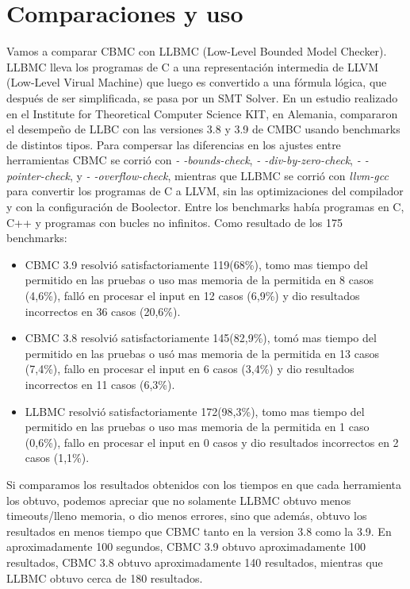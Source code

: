 \documentclass{llncs}
\begin{document}
\section{Comparaciones y uso}
    Vamos a comparar CBMC con LLBMC \cite{firstcomp} (Low-Level Bounded Model
    Checker). LLBMC lleva los programas
    de C a una representación intermedia de LLVM (Low-Level Virual Machine)
    que luego es convertido a una
    fórmula lógica, que después de ser simplificada, se pasa por un SMT Solver.
    En un estudio realizado en el Institute for Theoretical Computer Science
    KIT, en Alemania, compararon el desempeño de LLBC con las versiones 3.8 y
    3.9 de CMBC usando benchmarks de distintos tipos. Para compersar las
    diferencias en los ajustes entre herramientas CBMC se corrió con
    \emph{- -bounds-check}, \emph{- -div-by-zero-check}, \emph{-
    -pointer-check}, y \emph{- -overflow-check},
    mientras que LLBMC se corrió con \emph{llvm-gcc} para convertir los programas
    de C a LLVM, sin las optimizaciones del compilador y con la configuración de
    Boolector. Entre los benchmarks había programas en C, C++ y programas con
    bucles no infinitos.
    Como resultado de los 175 benchmarks:
    \begin{itemize}
    \item CBMC 3.9 resolvió satisfactoriamente 119(68\%), tomo mas tiempo del
        permitido en las pruebas o uso mas memoria de la permitida en 8 casos
        (4,6\%), falló en procesar el input en 12 casos (6,9\%) y dio resultados
        incorrectos en 36 casos (20,6\%).
    \item CBMC 3.8 resolvió satisfactoriamente 145(82,9\%), tomó mas tiempo del
        permitido en las pruebas o usó mas memoria de la permitida en 13 casos
        (7,4\%), fallo en procesar el input en 6 casos (3,4\%) y dio resultados
        incorrectos en 11 casos (6,3\%).
    \item LLBMC resolvió satisfactoriamente 172(98,3\%), tomo mas tiempo del
        permitido en las pruebas o uso mas memoria de la permitida en 1 caso
        (0,6\%), fallo en procesar el input en 0 casos y dio resultados
        incorrectos en 2 casos (1,1\%).
    \end{itemize}
    Si comparamos los resultados obtenidos con los tiempos en que cada
    herramienta los obtuvo, podemos apreciar que no solamente LLBMC obtuvo
    menos timeouts/lleno memoria, o dio menos errores, sino que además, obtuvo
    los resultados en menos tiempo que CBMC tanto en la version 3.8 como la
    3.9. En aproximadamente 100 segundos, CBMC 3.9 obtuvo aproximadamente 100
    resultados, CBMC 3.8 obtuvo aproximadamente 140 resultados, mientras que
    LLBMC obtuvo cerca de 180 resultados.
\end{document}

